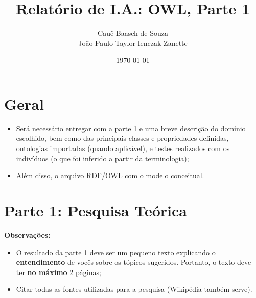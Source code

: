 \documentclass[answers]{exam}
\title{Relatório de I.A.: OWL, Parte 1}
\author{Cauê Baasch de Souza \\
        João Paulo Taylor Ienczak Zanette}
\date{\today}
\newcommand{\todo}[1]{{\color{red}{#1}}}
\begin{document}
    \maketitle{}

    \todo{%
        TO-DO\@:
        \begin{itemize}
            \item Adicionar enunciado da 2ª parte (parte prática);
            \item Escolher domínio dos exemplos.
        \end{itemize}
    }

    \section{Geral}

    \begin{superframe}
        \begin{itemize}
            \item Será necessário entregar com a parte 1 e uma breve descrição
                do domínio escolhido, bem como das principais classes e
                propriedades definidas, ontologias importadas (quando
                aplicável), e testes realizados com os indivíduos (o que foi
                inferido a partir da terminologia);

            \item Além disso, o arquivo RDF/OWL com o modelo conceitual.
        \end{itemize}
    \end{superframe}

    \section{Parte 1: Pesquisa Teórica}

    \begin{superframe}
        \textbf{Observações:}

        \begin{itemize}
            \item O resultado da parte 1 deve ser um pequeno texto
                explicando o \textbf{entendimento} de vocês sobre os
                tópicos sugeridos. Portanto, o texto deve ter \textbf{no
                máximo} 2 páginas;
            \item Citar todas as fontes utilizadas para a pesquisa
                (Wikipédia também serve).
        \end{itemize}
    \end{superframe}
\end{document}

